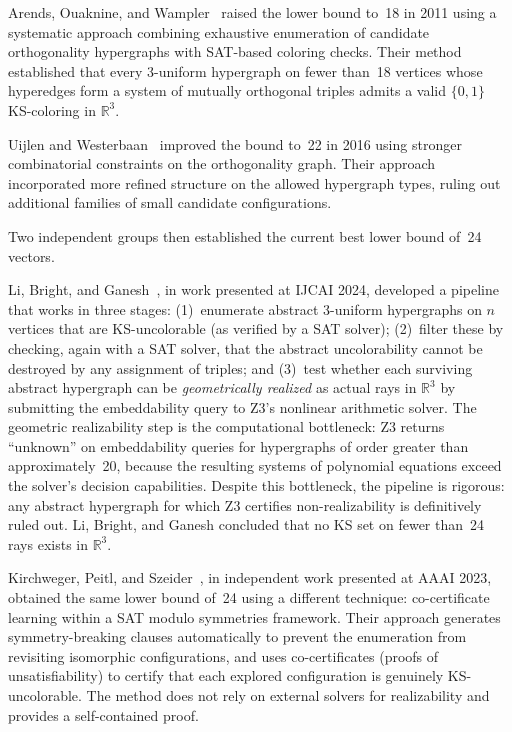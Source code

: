 \documentclass[twocolumn,pra,superscriptaddress,nofootinbib]{revtex4-2}
\newcommand{\R}{\mathbb{R}}
\begin{document}
Arends, Ouaknine, and Wampler~\cite{ArendsOuaknineWampler2011} raised the lower
bound to~18 in 2011 using a systematic approach combining exhaustive enumeration
of candidate orthogonality hypergraphs with SAT-based coloring checks.  Their
method established that every 3-uniform hypergraph on fewer than~18 vertices whose
hyperedges form a system of mutually orthogonal triples admits a valid $\{0,1\}$
KS-coloring in $\R^3$.

Uijlen and Westerbaan~\cite{UijlenWesterbaan2016} improved the bound to~22 in
2016 using stronger combinatorial constraints on the orthogonality graph.  Their
approach incorporated more refined structure on the allowed hypergraph types,
ruling out additional families of small candidate configurations.

Two independent groups then established the current best lower bound of~24 vectors.

Li, Bright, and Ganesh~\cite{LiBrightGanesh2024}, in work presented at IJCAI 2024,
developed a pipeline that works in three stages: (1)~enumerate abstract 3-uniform
hypergraphs on $n$ vertices that are KS-uncolorable (as verified by a SAT solver);
(2)~filter these by checking, again with a SAT solver, that the abstract
uncolorability cannot be destroyed by any assignment of triples; and (3)~test
whether each surviving abstract hypergraph can be \emph{geometrically realized}
as actual rays in $\R^3$ by submitting the embeddability query to Z3's nonlinear
arithmetic solver.  The geometric realizability step is the computational
bottleneck: Z3 returns ``unknown'' on embeddability queries for hypergraphs of
order greater than approximately~20, because the resulting systems of polynomial
equations exceed the solver's decision capabilities.  Despite this bottleneck, the
pipeline is rigorous: any abstract hypergraph for which Z3 certifies
non-realizability is definitively ruled out.  Li, Bright, and Ganesh concluded
that no KS set on fewer than~24 rays exists in $\R^3$.

Kirchweger, Peitl, and Szeider~\cite{KirchwegarPeitlSzeider2023}, in independent
work presented at AAAI 2023, obtained the same lower bound of~24 using a different
technique: co-certificate learning within a SAT modulo symmetries framework.  Their
approach generates symmetry-breaking clauses automatically to prevent the
enumeration from revisiting isomorphic configurations, and uses co-certificates
(proofs of unsatisfiability) to certify that each explored configuration is
genuinely KS-uncolorable.  The method does not rely on external solvers for
realizability and provides a self-contained proof.
\end{document}
